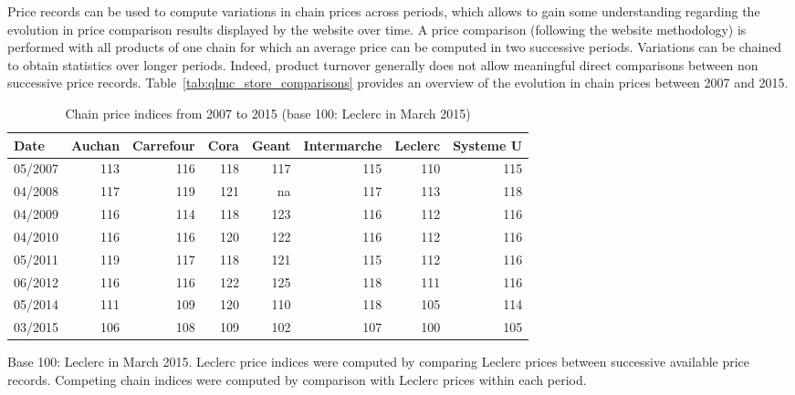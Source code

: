 \documentclass[english]{article}
\begin{document}
Price records can be used to compute variations in chain prices across periods, which allows to gain some understanding regarding the evolution in price comparison results displayed by the website over time. A price comparison (following the website methodology) is performed with all products of one chain for which an average price can be computed in two successive periods. Variations can be chained to obtain statistics over longer periods. Indeed, product turnover generally does not allow meaningful direct comparisons between non successive price records. Table~\ref{tab:qlmc_store_comparisons} provides an overview of the evolution in chain prices between 2007 and 2015.

\begin{table}[H]
\caption{Chain price indices from 2007 to 2015 (base 100: Leclerc in March 2015)}
\label{tab:qlmc_comparison_history}
\begin{threeparttable}
\renewcommand{\arraystretch}{0.7}%
  \small
    \begin{tabular}{lrrrrrrr}
    \toprule
    \toprule
    Date & Auchan & Carrefour & Cora  & Geant & Intermarche & Leclerc & Systeme U \\
    \midrule
    05/2007 & 113   & 116   & 118   & 117   & 115   & 110   & 115 \\
    04/2008 & 117   & 119   & 121   & na    & 117   & 113   & 118 \\
    04/2009 & 116   & 114   & 118   & 123   & 116   & 112   & 116 \\
    04/2010 & 116   & 116   & 120   & 122   & 116   & 112   & 116 \\
    05/2011 & 119   & 117   & 118   & 121   & 115   & 112   & 116 \\
    06/2012 & 116   & 116   & 122   & 125   & 118   & 111   & 116 \\
    05/2014 & 111   & 109   & 120   & 110   & 118   & 105   & 114 \\
    03/2015 & 106   & 108   & 109   & 102   & 107   & 100   & 105 \\
    \bottomrule
    \bottomrule
    \end{tabular}
\begin{tablenotes}
      \small
      \item Base 100: Leclerc in March 2015. Leclerc price indices were computed by comparing Leclerc prices between successive available price records. Competing chain indices were computed by comparison with Leclerc prices within each period.
\end{tablenotes}
\end{threeparttable}
\end{table}
\end{document}
